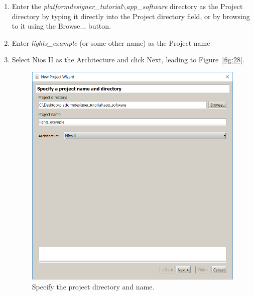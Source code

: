 \documentclass[11pt, twoside, pdftex]{article}
\begin{document}
\begin {enumerate}
  \item Enter the {\it platformdesigner\_tutorial$\backslash$app\_software} directory as the Project directory by
typing it directly into the Project directory field, or by browsing to it using the {\sf Browse...} button.
\item Enter {\it lights\_example} (or some other name) as the Project name
\item Select {\sf Nios II} as the Architecture and click {\sf Next}, 
leading to Figure~\ref{fig:28}.
~\\

\begin{figure}[H]
   \begin{center}
      \includegraphics[scale=0.6]{figures/figure27.png}
   \end{center}
   \caption{Specify the project directory and name.} 
	\label{fig:27}
\end{figure}


\end{enumerate}
\end{document}

